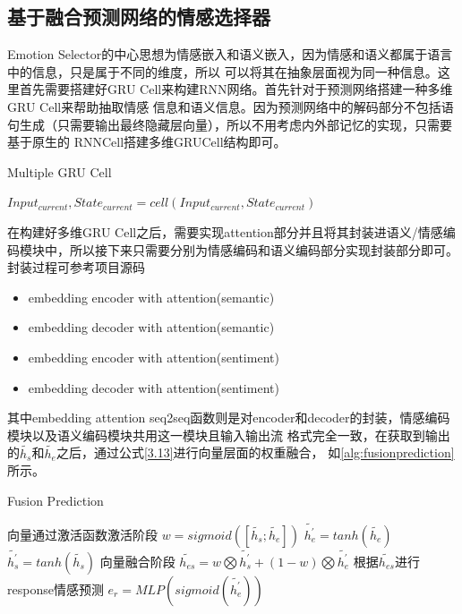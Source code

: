 \documentclass[supercite]{HustGraduPaper}
\theoremstyle{definition}
\begin{document}
\subsection{基于融合预测网络的情感选择器}
Emotion Selector的中心思想为情感嵌入和语义嵌入，因为情感和语义都属于语言中的信息，只是属于不同的维度，所以
可以将其在抽象层面视为同一种信息。这里首先需要搭建好GRU Cell来构建RNN网络。首先针对于预测网络搭建一种多维GRU Cell来帮助抽取情感
信息和语义信息。因为预测网络中的解码部分不包括语句生成（只需要输出最终隐藏层向量），所以不用考虑内外部记忆的实现，只需要基于原生的
RNNCell搭建多维GRUCell结构即可。

\begin{algorithm}
  \caption{Multiple GRU Cell}
  \label{alg:mtgc}
  \begin{algorithmic}
      \State $Input_{current}, State_{current} = cell(Input_{current}, State_{current})$
    \EndFor
  \end{algorithmic}
\end{algorithm}

在构建好多维GRU Cell之后，需要实现attention部分并且将其封装进语义/情感编码模块中，所以接下来只需要分别为情感编码和语义编码部分实现封装部分即可。封装过程可参考项目源码
\cite{ECMP}
\begin{itemize}
  \item embedding encoder with attention(semantic)
  \item embedding decoder with attention(semantic)
  \item embedding encoder with attention(sentiment)
  \item embedding decoder with attention(sentiment)
\end{itemize}

其中embedding attention seq2seq函数则是对encoder和decoder的封装，情感编码模块以及语义编码模块共用这一模块且输入输出流
格式完全一致，在获取到输出的$\widetilde{h_s}$和$\widetilde{h_e}$之后，通过公式\ref{3.13}进行向量层面的权重融合，
如\ref{alg:fusionprediction}所示。
\begin{algorithm}
  \caption{Fusion Prediction}
  \label{alg:fusionprediction}
  \begin{algorithmic}
      \State 向量通过激活函数激活阶段
      \State $w = sigmoid([\widetilde{h_s};\widetilde{h_e}])$
      \State ${\widetilde{h_e^{'}}} = tanh(\widetilde{h_e})$
      \State ${\widetilde{h_s^{'}}} = tanh(\widetilde{h_s})$
      \State 向量融合阶段
      \State ${\widetilde{h_{es}}} = w \bigotimes {\widetilde{h_s^{'}}} + (1 - w) \bigotimes {\widetilde{h_e^{'}}}$
      \State 根据$\widetilde{h_{es}}$进行response情感预测
      \State $e_r = MLP(sigmoid(\widetilde{h_e^{'}}))$
  \end{algorithmic}
\end{algorithm}
\end{document}
